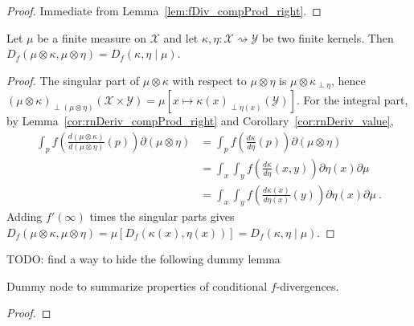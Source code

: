 \begin{proof} \leanok
{}
Immediate from Lemma~\ref{lem:fDiv_compProd_right}.
\end{proof}


\begin{lemma}
  \label{lem:fDiv_compProd_right}
  \leanok
  Let $\mu$ be a finite measure on $\mathcal X$ and let $\kappa, \eta : \mathcal X \rightsquigarrow \mathcal Y$ be two finite kernels.
  Then $D_f(\mu \otimes \kappa, \mu \otimes \eta) = D_f(\kappa, \eta \mid \mu)$.
\end{lemma}

\begin{proof} \leanok
{}
The singular part of $\mu \otimes \kappa$ with respect to $\mu \otimes \eta$ is $\mu \otimes \kappa_{\perp \eta}$, hence $(\mu \otimes \kappa)_{\perp (\mu \otimes \eta)}(\mathcal X \times \mathcal Y) = \mu\left[x \mapsto \kappa(x)_{\perp \eta(x)}(\mathcal Y)\right]$.
For the integral part, by Lemma~\ref{cor:rnDeriv_compProd_right} and Corollary~\ref{cor:rnDeriv_value},
\begin{align*}
\int_{p} f\left(\frac{d (\mu \otimes \kappa)}{d (\mu \otimes \eta)}(p)\right) \partial(\mu \otimes \eta)
&= \int_{p} f\left(\frac{d \kappa}{d \eta}(p)\right) \partial(\mu \otimes \eta)
\\
&= \int_x \int_y f\left(\frac{d \kappa}{d \eta}(x, y)\right) \partial \eta(x) \partial \mu
\\
&= \int_x \int_y f\left(\frac{d \kappa(x)}{d \eta(x)}(y)\right) \partial \eta(x) \partial \mu
\: .
\end{align*}
Adding $f'(\infty)$ times the singular parts gives $D_f(\mu \otimes \kappa, \mu \otimes \eta) = \mu\left[D_f(\kappa(x), \eta(x))\right] = D_f(\kappa, \eta \mid \mu)$.
\end{proof}




TODO: find a way to hide the following dummy lemma
\begin{lemma}
  \label{lem:condFDiv_properties}
  \leanok
  Dummy node to summarize properties of conditional $f$-divergences.
\end{lemma}

\begin{proof}\leanok
{}
\end{proof}










